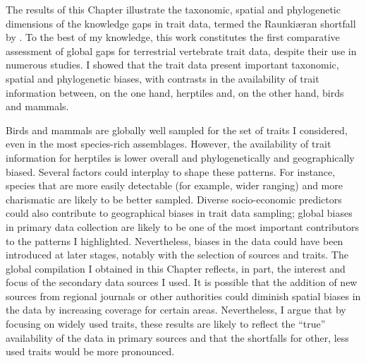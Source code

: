 The results of this Chapter illustrate the taxonomic, spatial and phylogenetic dimensions of the knowledge gaps in trait data, termed the Raunkiæran shortfall by \citet{Hortal2015}. To the best of my knowledge, this work constitutes the first comparative assessment of global gaps for terrestrial vertebrate trait data, despite their use in numerous studies. I showed that the trait data present important taxonomic, spatial and phylogenetic biases, with contrasts in the availability of trait information between, on the one hand, herptiles and, on the other hand, birds and mammals.

Birds and mammals are globally well sampled for the set of traits I considered, even in the most species-rich assemblages. However, the availability of trait information for herptiles is lower overall and phylogenetically and geographically biased. Several factors could interplay to shape these patterns. For instance, species that are more easily detectable (for example, wider ranging) and more charismatic are likely to be better sampled. Diverse socio-economic predictors could also contribute to geographical biases in trait data sampling; global biases in primary data collection are likely to be one of the most important contributors to the patterns I highlighted. Nevertheless, biases in the data could have been introduced at later stages, notably with the selection of sources and traits. The global compilation I obtained in this Chapter reflects, in part, the interest and focus of the secondary data sources I used. It is possible that the addition of new sources from regional journals or other authorities could diminish spatial biases in the data by increasing coverage for certain areas. Nevertheless, I argue that by focusing on widely used traits, these results are likely to reflect the “true” availability of the data in primary sources and that the shortfalls for other, less used traits would be more pronounced.

